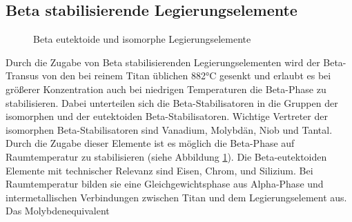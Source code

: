 \documentclass[a4paper, 11pt]{tubsreprt}
\begin{document}
\subsection{Beta stabilisierende Legierungselemente}

\begin{figure}
\caption{Beta eutektoide und isomorphe Legierungselemente}
\label{Beta eutektisch isomorphe legierungselemente}
\end{figure}

Durch die Zugabe von Beta stabilisierenden Legierungselementen wird der Beta-Transus von den bei reinem Titan üblichen 882°C gesenkt und erlaubt es bei größerer Konzentration auch bei niedrigen Temperaturen die Beta-Phase zu stabilisieren. Dabei unterteilen sich die Beta-Stabilisatoren in die Gruppen der isomorphen und der eutektoiden Beta-Stabilisatoren.
Wichtige Vertreter der isomorphen Beta-Stabilisatoren sind Vanadium, Molybdän, Niob und Tantal. Durch die Zugabe dieser Elemente ist es möglich die Beta-Phase auf Raumtemperatur zu stabilisieren (siehe Abbildung \ref{Beta eutektisch isomorphe legierungselemente}).
Die Beta-eutektoiden Elemente mit technischer Relevanz sind Eisen, Chrom, und Silizium. Bei Raumtemperatur bilden sie eine Gleichgewichtsphase aus Alpha-Phase und intermetallischen Verbindungen zwischen Titan und dem Legierungselement aus. Das Molybdenequivalent
\end{document}
